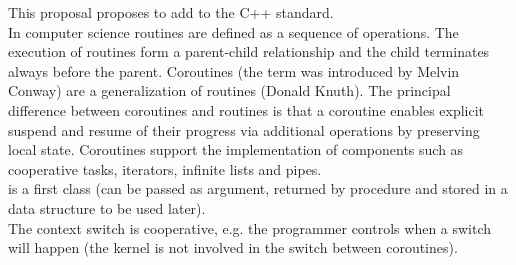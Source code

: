 
This proposal proposes to add \coro to the C++ standard.\\
\newline
In computer science routines are defined as a sequence of operations. The
execution of routines form a parent-child relationship and the child terminates
always before the parent. Coroutines (the term was introduced by Melvin
Conway\cite{Conway1963}) are a generalization of routines (Donald Knuth\cite{Knuth1997}). The
principal difference between coroutines and routines is that a coroutine enables
explicit suspend and resume of their progress via additional operations by
preserving local state. Coroutines support the implementation of components such
as cooperative tasks, iterators, infinite lists and pipes.\\
\newline
\coro is a first class \continuation (can be passed as argument, returned
by procedure and stored in a data structure to be used later).\\
The context switch is cooperative, e.g. the programmer controls when a switch
will happen (the kernel is not involved in the switch between coroutines).\\
\newline
{}
